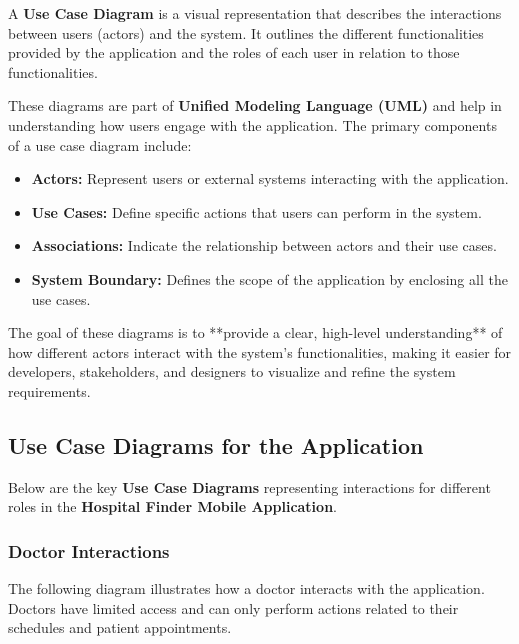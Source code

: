 \documentclass[12pt]{report}
\begin{document}
\noindent A \textbf{Use Case Diagram} is a visual representation that describes the interactions between users (actors) and the system. It outlines the different functionalities provided by the application and the roles of each user in relation to those functionalities.

\noindent These diagrams are part of \textbf{Unified Modeling Language (UML)} and help in understanding how users engage with the application. The primary components of a use case diagram include:

\begin{itemize}
	\item \textbf{Actors:} Represent users or external systems interacting with the application.
	\item \textbf{Use Cases:} Define specific actions that users can perform in the system.
	\item \textbf{Associations:} Indicate the relationship between actors and their use cases.
	\item \textbf{System Boundary:} Defines the scope of the application by enclosing all the use cases.
\end{itemize}

\noindent The goal of these diagrams is to **provide a clear, high-level understanding** of how different actors interact with the system’s functionalities, making it easier for developers, stakeholders, and designers to visualize and refine the system requirements.

\subsection{\textbf{Use Case Diagrams for the Application}}

\noindent Below are the key \textbf{Use Case Diagrams} representing interactions for different roles in the \textbf{Hospital Finder Mobile Application}.

\subsubsection{\textbf{Doctor Interactions}}
The following diagram illustrates how a doctor interacts with the application. Doctors have limited access and can only perform actions related to their schedules and patient appointments.
\end{document}
